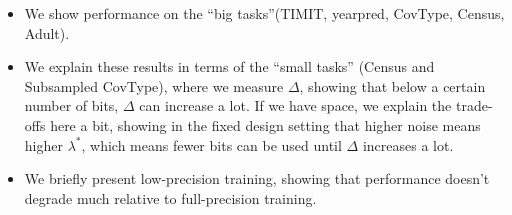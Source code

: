 
\begin{itemize}
	\item We show performance on the ``big tasks''(TIMIT, yearpred, CovType, Census, Adult).
	\item We explain these results in terms of the ``small tasks'' (Census and Subsampled CovType), where we measure $\Delta$, showing that below a certain number of bits, $\Delta$ can increase a lot.  If we have space, we explain the trade-offs here a bit, showing in the fixed design setting that higher noise means higher $\lambda^*$, which means fewer bits can be used until $\Delta$ increases a lot.
	\item We briefly present low-precision training, showing that performance doesn't degrade much relative to full-precision training.
\end{itemize}